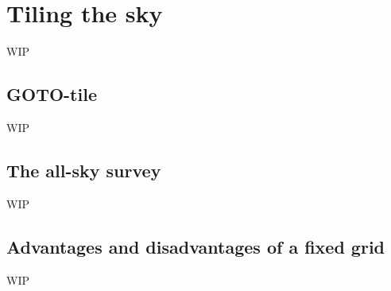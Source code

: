 \section{Tiling the sky}
\label{sec:tiling}
\begin{colsection}


\begin{colsection}

WIP

\end{colsection}


\subsection{GOTO-tile}
\label{sec:gototile}
\begin{colsection}

WIP

\end{colsection}


\subsection{The all-sky survey}
\label{sec:survey}
\begin{colsection}

WIP

\end{colsection}


\subsection{Advantages and disadvantages of a fixed grid}
\label{sec:fixed_grid}
\begin{colsection}

WIP

\end{colsection}


\end{colsection}


\newpage

